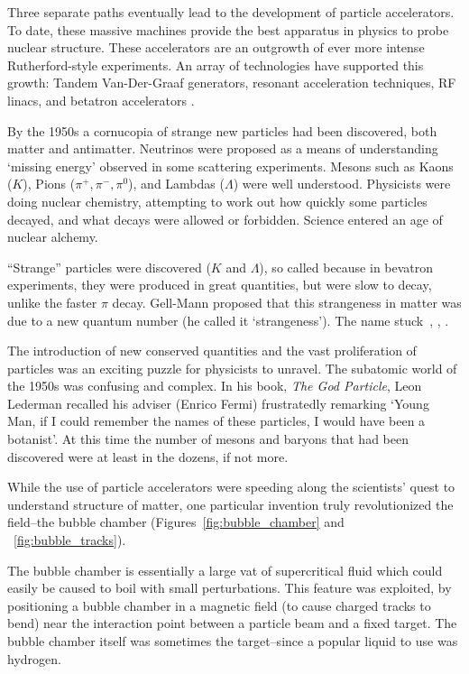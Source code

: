 Three separate paths eventually lead to the development of particle
accelerators. To date, these massive machines provide the best apparatus in
physics to probe nuclear structure. These accelerators are an outgrowth of ever
more intense Rutherford-style experiments. An array of technologies have
supported this growth: Tandem Van-Der-Graaf generators, resonant acceleration
techniques, RF linacs, and betatron accelerators \cite{Bryant1994}.

By the 1950s a cornucopia of strange new particles had been discovered, both
matter and antimatter. Neutrinos were proposed as a means of understanding
`missing energy' observed in some scattering experiments. Mesons such as Kaons
($K$), Pions ($\pi^+,\pi^-,\pi^0$), and Lambdas ($\Lambda$) were well
understood.  Physicists were doing nuclear chemistry, attempting to work out how
quickly some particles decayed, and what decays were allowed or forbidden.
Science entered an age of nuclear alchemy.

``Strange'' particles were discovered ($K$ and $\Lambda$), so called because in
bevatron experiments, they were produced in great quantities, but were slow to
decay, unlike the faster $\pi$ decay. Gell-Mann proposed that this strangeness
in matter was due to a new quantum number (he called it `strangeness'). The name
stuck~\cite{Gell-Mann1953}, \cite{Gell-Mann1956}, \cite{Krauss2015}.

The introduction of new conserved quantities and the vast proliferation of
particles was an exciting puzzle for physicists to unravel. The subatomic world
of the 1950s was confusing and complex. In his book, \textit{The God Particle},
Leon Lederman recalled his adviser (Enrico Fermi) frustratedly remarking `Young
Man, if I could remember the names of these particles, I would have been a
botanist'.  At this time the number of mesons and baryons that had been
discovered were at least in the dozens, if not more.

While the use of particle accelerators were speeding along the scientists' quest
to understand structure of matter, one particular invention truly revolutionized
the field--the bubble chamber (Figures~\ref{fig:bubble_chamber} and
~\ref{fig:bubble_tracks}).

The bubble chamber is essentially a large vat of supercritical fluid which could
easily be caused to boil with small perturbations. This feature was exploited,
by positioning a bubble chamber in a magnetic field (to cause charged tracks to
bend) near the interaction point between a particle beam and a fixed target. The
bubble chamber itself was sometimes the target--since a popular liquid to use
was hydrogen. 

